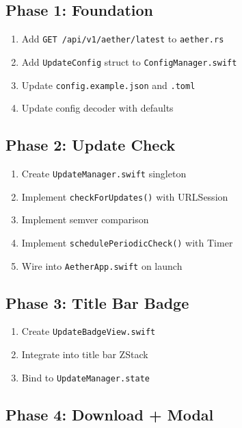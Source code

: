 \documentclass[11pt, a4paper]{article}
\begin{document}
\subsection{Phase 1: Foundation}

\begin{enumerate}[nosep, leftmargin=*]
  \item Add \texttt{GET /api/v1/aether/latest} to \texttt{aether.rs}
  \item Add \texttt{UpdateConfig} struct to \texttt{ConfigManager.swift}
  \item Update \texttt{config.example.json} and \texttt{.toml}
  \item Update config decoder with defaults
\end{enumerate}

\subsection{Phase 2: Update Check}

\begin{enumerate}[nosep, leftmargin=*, start=5]
  \item Create \texttt{UpdateManager.swift} singleton
  \item Implement \texttt{checkForUpdates()} with URLSession
  \item Implement semver comparison
  \item Implement \texttt{schedulePeriodicCheck()} with Timer
  \item Wire into \texttt{AetherApp.swift} on launch
\end{enumerate}

\subsection{Phase 3: Title Bar Badge}

\begin{enumerate}[nosep, leftmargin=*, start=10]
  \item Create \texttt{UpdateBadgeView.swift}
  \item Integrate into title bar ZStack
  \item Bind to \texttt{UpdateManager.state}
\end{enumerate}

\subsection{Phase 4: Download + Modal}
\end{document}

